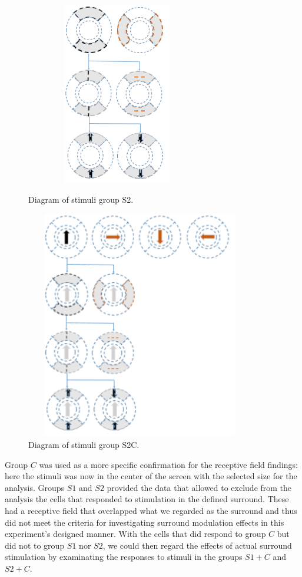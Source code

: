 \begin{figure}[H] \centering
\begin{minipage}{0.4\textwidth}
 \includegraphics[width=8cm,height=8cm,keepaspectratio]{Figures/4.Chapter/S2.PNG} \caption{Diagram of stimuli group S2.}
\end{minipage} 
\begin{minipage}{0.4\textwidth}
\includegraphics[width=10cm,height=10cm,keepaspectratio]{Figures/4.Chapter/S2C.PNG} \caption{Diagram of stimuli group S2C.} 
\end{minipage}
\end{figure}
Group $C$ was used as a more specific confirmation for the receptive field findings: here the stimuli was now in the center of the screen with the selected size for the analysis. Groups $S1$ and $S2$ provided the data that allowed to exclude from the analysis the cells that responded to stimulation in the defined surround. These had a receptive field that overlapped what we regarded as the surround and thus did not meet the criteria for investigating surround modulation effects in this experiment's designed manner. With the cells that did respond to group $C$ but did not to group $S1$ nor $S2$, we could then regard the effects of actual surround stimulation by examinating the responses to stimuli in the groups $S1+C$ and $S2+C$.